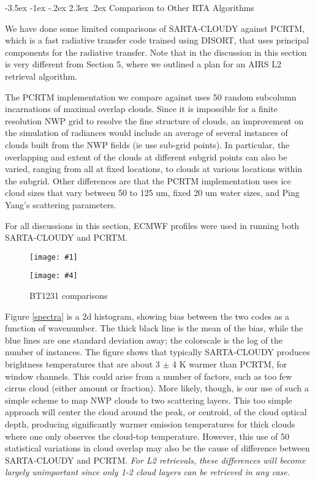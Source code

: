 \documentclass[11pt]{article}
\makeatletter
\newcommand{\sasc}{\textsf{SARTA-CLOUDY}\xspace}
\newcommand{\pcrtm}{\textsf{PCRTM}\xspace}
\newcommand{\dfigure}[6]
{
\begin{figure}
  \begin{minipage}[t]{0.47\textwidth}
  \centering
  \texttt{[image: \#1]}
   \caption{#2}  \label{#3}
  \end{minipage}
  \hfil
  \begin{minipage}[t]{0.47\linewidth}
  \centering
  \texttt{[image: \#4]}
   \caption{#5}  \label{#6}
  \end{minipage}
\end{figure}
}
\renewcommand{\section}{\@startsection {section}{1}{\z@}%
                                   {-3.5ex \@plus -1ex \@minus -.2ex}%
                                   {2.3ex \@plus.2ex}%
                                   {\reset@font\large\bfseries}}
\makeatother
\begin{document}
\section{Comparison to Other RTA Algorithms}

We have done some limited comparisons of \sasc against \pcrtm,
which is a fast radiative transfer code trained using DISORT, that
uses principal components for the radiative transfer.  Note
that in the discussion in this section is very different from Section
5, where we outlined a plan for an AIRS L2 retrieval algorithm.

The \pcrtm implementation we compare against uses 50 random subcolumn
incarnations of maximal overlap clouds. Since it is impossible for a
finite resolution NWP grid to resolve the fine structure of clouds, an
improvement on the simulation of radiances would include an average of
several instances of clouds built from the NWP fields (ie use sub-grid
points). In particular, the overlapping and extent of the clouds at
different subgrid points can also be varied, ranging from all at fixed
locations, to clouds at various locations within the subgrid.  Other
differences are that the \pcrtm implementation uses ice cloud sizes
that vary between 50 to 125 um, fixed 20 um water sizes, and Ping
Yang's scattering parameters.

For all discussions in this section, ECMWF profiles were used in running
both \sasc and \pcrtm.

\dfigure{Figs/spectra_sartaVSpcrtm.jpg}{Comparing \sasc vs
  \pcrtm}{spectra}{Figs/pcrtm_calc_vs_sarta_biasV1}{BT1231
  comparisons}{bt1231_sarta_pcrtm}

Figure \ref{spectra} is a 2d histogram, showing bias between the two
codes as a function of wavenumber. The thick black line is the mean of
the bias, while the blue lines are one standard deviation away; the
colorscale is the log of the number of instances. The figure shows
that typically \sasc produces brightness temperatures that are about 3
$\pm$ 4 K warmer than \pcrtm, for window channels. This could arise
from a number of factors, such as too few cirrus cloud (either
amount or fraction). More likely, though, is our use of such a simple
scheme to map NWP clouds to two scattering layers.  This too simple
approach will center the cloud around the peak, or centroid, of the
cloud optical depth, producing significantly warmer emission
temperatures for thick clouds where one only observes the cloud-top
temperature. However, this use of 50 statistical variations in cloud
overlap may also be the cause of difference between \sasc and \pcrtm.
\emph{For L2 retrievals, these differences will become largely
  unimportant since only 1-2 cloud layers can be retrieved in any case.}
\end{document}
